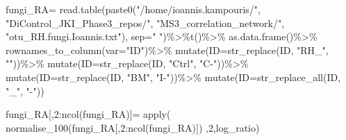 \documentclass[
]{article}
\newenvironment{Shaded}{\begin{snugshade}}{\end{snugshade}}
\newcommand{\AttributeTok}[1]{\textcolor[rgb]{0.77,0.63,0.00}{#1}}
\newcommand{\DecValTok}[1]{\textcolor[rgb]{0.00,0.00,0.81}{#1}}
\newcommand{\FunctionTok}[1]{\textcolor[rgb]{0.00,0.00,0.00}{#1}}
\newcommand{\NormalTok}[1]{#1}
\newcommand{\OtherTok}[1]{\textcolor[rgb]{0.56,0.35,0.01}{#1}}
\newcommand{\SpecialCharTok}[1]{\textcolor[rgb]{0.00,0.00,0.00}{#1}}
\newcommand{\StringTok}[1]{\textcolor[rgb]{0.31,0.60,0.02}{#1}}
\begin{document}
\begin{Shaded}
\begin{Highlighting}[]
\NormalTok{fungi\_RA}\OtherTok{=} 
  \FunctionTok{read.table}\NormalTok{(}\FunctionTok{paste0}\NormalTok{(}\StringTok{"/home/ioannis.kampouris/"}\NormalTok{,}
\StringTok{"DiControl\_JKI\_Phase3\_repos/"}\NormalTok{,}
\StringTok{"MS3\_correlation\_network/"}\NormalTok{,}
\StringTok{"otu\_RH.fungi.Ioannis.txt"}\NormalTok{), }\AttributeTok{sep=}\StringTok{" "}\NormalTok{)}\SpecialCharTok{\%\textgreater{}\%}\FunctionTok{t}\NormalTok{()}\SpecialCharTok{\%\textgreater{}\%}
  \FunctionTok{as.data.frame}\NormalTok{()}\SpecialCharTok{\%\textgreater{}\%}
  \FunctionTok{rownames\_to\_column}\NormalTok{(}\AttributeTok{var=}\StringTok{"ID"}\NormalTok{)}\SpecialCharTok{\%\textgreater{}\%}
  \FunctionTok{mutate}\NormalTok{(}\AttributeTok{ID=}\FunctionTok{str\_replace}\NormalTok{(ID, }\StringTok{"RH\_"}\NormalTok{, }\StringTok{""}\NormalTok{))}\SpecialCharTok{\%\textgreater{}\%}
  \FunctionTok{mutate}\NormalTok{(}\AttributeTok{ID=}\FunctionTok{str\_replace}\NormalTok{(ID, }\StringTok{"Ctrl"}\NormalTok{, }\StringTok{"C{-}"}\NormalTok{))}\SpecialCharTok{\%\textgreater{}\%}
  \FunctionTok{mutate}\NormalTok{(}\AttributeTok{ID=}\FunctionTok{str\_replace}\NormalTok{(ID, }\StringTok{"BM"}\NormalTok{, }\StringTok{"I{-}"}\NormalTok{))}\SpecialCharTok{\%\textgreater{}\%}
  \FunctionTok{mutate}\NormalTok{(}\AttributeTok{ID=}\FunctionTok{str\_replace\_all}\NormalTok{(ID, }\StringTok{"\_"}\NormalTok{, }\StringTok{"{-}"}\NormalTok{))}

\NormalTok{fungi\_RA[,}\DecValTok{2}\SpecialCharTok{:}\FunctionTok{ncol}\NormalTok{(fungi\_RA)]}\OtherTok{=} 
  \FunctionTok{apply}\NormalTok{( }\FunctionTok{normalise\_100}\NormalTok{(fungi\_RA[,}\DecValTok{2}\SpecialCharTok{:}\FunctionTok{ncol}\NormalTok{(fungi\_RA)])  ,}\DecValTok{2}\NormalTok{,log\_ratio)}


\end{Highlighting}
\end{Shaded}
\end{document}
